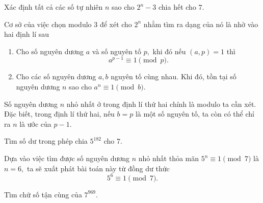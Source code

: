 \begin{bx}
Xác định tất cả các số tự nhiên $n$ sao cho $2^n-3$ chia hết cho $7.$
    \begin{luuy}
 Cơ sở của việc chọn modulo $3$ để xét cho $2^n$ nhằm tìm ra dạng của nó là nhờ vào hai định lí sau
    \begin{enumerate}
        \item Cho số nguyên dương $a$ và số nguyên tố $p,$ khi đó nếu $(a,p)=1$ thì $$a^{p-1}\equiv 1\pmod{p}.$$
        \item Cho các số nguyên dương $a,b$ nguyên tố cùng nhau. Khi đó, tồn tại số nguyên dương $n$ sao cho $a^n\equiv1\pmod{b}.$
    \end{enumerate}
    Số nguyên dương $n$ nhỏ nhất ở trong định lí thứ hai chính là modulo ta cần xét. Đặc biết, trong định lí thứ hai, nếu $b=p$ là một số nguyên tố, ta còn có thể chỉ ra $n$ là ước của $p-1.$
    \end{luuy}
\end{bx}

\begin{bx}
Tìm số dư trong phép chia $5^{182}$ cho $7.$
\end{bx}
\nx Dựa vào việc tìm được số nguyên dương $n$ nhỏ nhất thỏa mãn $5^n\equiv 1\pmod{7}$ là $n=6,$ ta sẽ xuất phát bài toán này từ đồng dư thức
\[5^6\equiv 1\pmod{7}.\]

\begin{bx}
Tìm chữ số tận cùng của $ 7^{969}.$
\end{bx}

